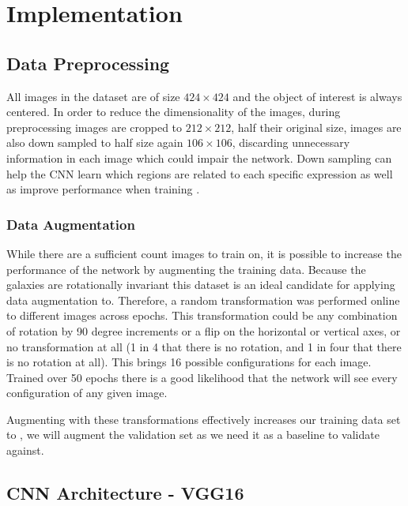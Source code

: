 \section{Implementation}


\subsection{Data Preprocessing}

All images in the dataset are of size $424\times424$ and the object of interest is always centered. In order to reduce the dimensionality of the images, during preprocessing images are cropped to $212\times212$, half their original size, images are also down sampled to half size again $ 106\times 106$, discarding unnecessary information in each image which could impair the network. Down sampling can help the CNN learn which regions are related to each specific expression as well as improve performance when training \cite{deep-learning-review}.

\subsubsection{Data Augmentation}\label{aug}
While there are a sufficient count images to train on, it is possible to increase the performance of the network by augmenting the training data. Because the galaxies are rotationally invariant this dataset is an ideal candidate for applying data augmentation to. Therefore, a random transformation was performed online to different images across epochs. This transformation could be any combination of rotation by 90 degree increments or a flip on the horizontal or vertical axes, or no transformation at all (1 in 4 that there is no rotation, and 1 in four that there is no rotation at all). This brings 16 possible configurations for each image. Trained over 50 epochs there is a good likelihood that the network will see every configuration of any given image.

Augmenting with these transformations effectively increases our training data set to , we will augment the validation set as we need it as a baseline to validate against.

\subsection{CNN Architecture - VGG16}

